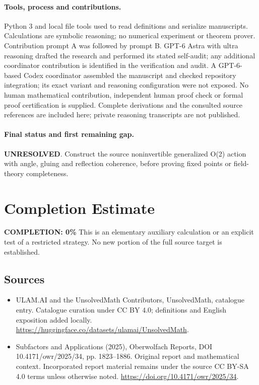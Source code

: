\documentclass[11pt]{article}
\begin{document}
\paragraph{Tools, process and contributions.}
Python 3 and local file tools used to read definitions and serialize manuscripts. Calculations are symbolic reasoning; no numerical experiment or theorem prover. Contribution prompt A was followed by prompt B. GPT-6 Astra with ultra reasoning drafted the research and performed its stated self-audit; any additional coordinator contribution is identified in the verification and audit. A GPT-6-based Codex coordinator assembled the manuscript and checked repository integration; its exact variant and reasoning configuration were not exposed. No human mathematical contribution, independent human proof check or formal proof certification is supplied. Complete derivations and the consulted source references are included here; private reasoning transcripts are not published.

\paragraph{Final status and first remaining gap.}
\textbf{UNRESOLVED}. Construct the source noninvertible generalized O(2) action with angle, gluing and reflection coherence, before proving fixed points or field-theory completeness.

\section{Completion Estimate}
\noindent\textbf{COMPLETION: 0\%}
This is an elementary auxiliary calculation or an explicit test of a restricted strategy. No new portion of the full source target is established.

\subsection{Sources}
\begin{itemize}
\item[\hypertarget{source:statement:1}{S1}] ULAM.AI and the UnsolvedMath Contributors, UnsolvedMath, catalogue entry. Catalogue curation under CC BY 4.0; definitions and English exposition added locally.
\url{https://huggingface.co/datasets/ulamai/UnsolvedMath}.
\item[\hypertarget{source:statement:2}{S2}] Subfactors and Applications (2025), Oberwolfach Reports, DOI 10.4171/owr/2025/34, pp. 1823--1886. Original report and mathematical context. Incorporated report material remains under the source CC BY-SA 4.0 terms unless otherwise noted.
\url{https://doi.org/10.4171/owr/2025/34}.
\end{itemize}
\label{end:statement}
\end{document}
